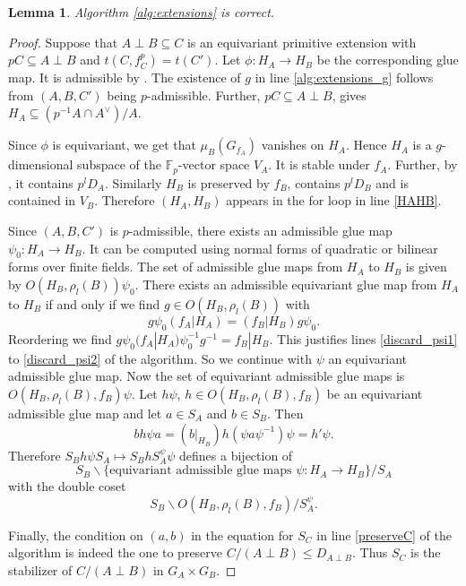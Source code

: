 \documentclass[a4paper]{amsart}
\theoremstyle{definition}
\theoremstyle{plain}
\newtheorem{lemma}[definition]{Lemma}
\newcommand{\FF}{\mathbb{F}}
\newcommand{\disc}[1]{{D_{#1}}}
\begin{document}
\begin{lemma}
 Algorithm \ref{alg:extensions} is correct.
\end{lemma}

\begin{proof}
 Suppose that $A \perp B \subseteq C$ is an equivariant
 primitive extension with $pC \subseteq A \perp B$ and $t(C,f_C^p)=t(C')$. Let $\phi \colon H_A \to H_B$ be the corresponding glue map. It is admissible by .
 The existence of $g$ in line \ref{alg:extensions_g} follows from $(A,B,C')$ being $p$-admissible.
 Further, $p C \subseteq A \perp B$, gives $H_A \subseteq (p^{-1}A\cap A^\vee)/A$.

 Since $\phi$ is equivariant, we get that $\mu_B(G_{f_A})$ vanishes on $H_A$.
 Hence $H_A$ is a $g$-dimensional subspace of the $\FF_p$-vector space $V_A$.
 It is stable under $f_A$. Further, by , it contains $p^l D_A$.
 Similarly $H_B$ is preserved by $f_B$, contains $p^l D_B$ and is contained in $V_B$. Therefore $(H_A,H_B)$ appears in the for loop in line \ref{HAHB}.

 Since $(A,B,C')$ is $p$-admissible,
 there exists an admissible glue map
 $\psi_0\colon H_A \to H_B$. It can be computed using normal forms of quadratic or bilinear forms over finite fields.
 The set of admissible glue maps from $H_A$ to $H_B$ is given by $O(H_B, \rho_l(B))\psi_0$.
 There exists an admissible equivariant glue map from $H_A$ to $H_B$ if and only if we find $g \in O(H_B,\rho_l(B))$ with
 \[g \psi_0  (f_A|H_A) = (f_B|H_B) g \psi_0.\]
 Reordering we find $g  \psi_0  (f_A|H_A) \psi_0^{-1}  g^{-1} = f_B|H_B$.
 This justifies lines \ref{discard_psi1} to \ref{discard_psi2} of the algorithm. So we continue with $\psi$ an equivariant admissible glue map.
 Now the set of equivariant admissible glue maps is $O(H_B,\rho_l(B),f_B)\psi$.
 Let $h \psi$, $h \in O(H_B,\rho_l(B),f_B)$ be an equivariant admissible glue map and let $a \in S_A$ and $b \in S_B$.
 Then
 \[b h\psi a = (b|_{H_B}) h (\psi a \psi^{-1}) \psi = h' \psi.\]
 Therefore $S_B h\psi S_A \mapsto S_B h S_A^{\psi} \psi$ defines a bijection of
 \[S_B \backslash \{\mbox{equivariant admissible glue maps } \psi\colon H_A \to  H_B\}/S_A \]
 with the double coset
\[ S_B \backslash O(H_B,\rho_l(B),f_B)/S_A^\psi.\]

 Finally, the condition on $(a,b)$ in the equation for $S_C$ in line \ref{preserveC} of the algorithm
 is indeed the one to preserve $C/(A\perp B) \leq \disc{A \perp B}$.
 Thus $S_C$ is the stabilizer of $C/(A \perp B)$ in $G_A \times G_B$.
\end{proof}
\end{document}

